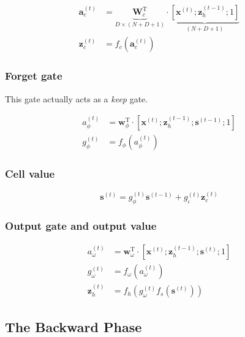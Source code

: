 \documentclass[11pt]{article}
\begin{document}
\begin{align}
  \mathbf{a}_{c}^{(t)}
  & = \underbrace{\mathbf{W}_{c}^{\text{T}}}_{D \times (N+D+1)}
    \cdot \underbrace{\left[\mathbf{x}^{(t)}; \mathbf{z}_{h}^{(t-1)};
    1\right]}_{(N+D+1)} \\
  \mathbf{z}_{c}^{(t)}
  & = f_{c}\left(\mathbf{a}_{c}^{(t)}\right)
\end{align}

\subsubsection*{Forget gate}

This gate actually acts as a \emph{keep} gate.

\begin{align}
  a_{\phi}^{(t)}
  & = \mathbf{w}_{\phi}^{\text{T}} \cdot
    \left[\mathbf{x}^{(t)}; \mathbf{z}_{h}^{(t-1)}; \mathbf{s}^{(t-1)};
    1\right] \\
  g_{\phi}^{(t)}
  & = f_{\phi}\left(a_{\phi}^{(t)}\right)
\end{align}

\subsubsection*{Cell value}

\begin{equation}
  \mathbf{s}^{(t)} =
  g_{\phi}^{(t)} \mathbf{s}^{(t-1)} + g_{\iota}^{(t)} \mathbf{z}_{c}^{(t)}
\end{equation}

\subsubsection*{Output gate and output value}

\begin{align}
  a_{\omega}^{(t)}
  & = \mathbf{w}_{\omega}^{\text{T}} \cdot
    \left[\mathbf{x}^{(t)}; \mathbf{z}_{h}^{(t-1)}; \mathbf{s}^{(t)};
    1\right] \\
  g_{\omega}^{(t)} & = f_{\omega}\left(a_{\omega}^{(t)}\right) \\
  \mathbf{z}_h^{(t)} & = f_h\left(g_{\omega}^{(t)} f_s\left(\mathbf{s}^{(t)}\right)\right)
\end{align}

\subsection{The Backward Phase}
\end{document}
